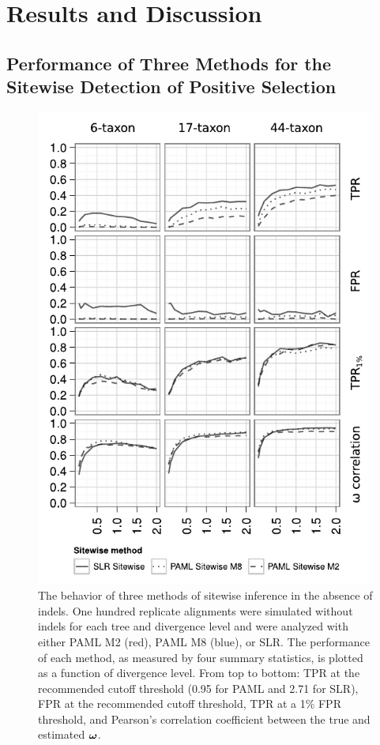 \documentclass{mbe}
\begin{document}
\section*{Results and Discussion}

\subsection*{Performance of Three Methods for the Sitewise Detection of Positive Selection}

\begin{figure}[h]
\begin{center}
\includegraphics[scale=0.75]{fig2.pdf}
\end{center}
\caption{The behavior of three methods of sitewise inference in the
  absence of indels. One hundred replicate alignments were simulated
  without indels for each tree and divergence level and were analyzed
  with either PAML M2 (red), PAML M8 (blue), or SLR. The performance
  of each method, as measured by four summary statistics, is plotted
  as a function of divergence level. From top to bottom: TPR at the
  recommended cutoff threshold (0.95 for PAML and 2.71 for SLR), FPR
  at the recommended cutoff threshold, TPR at a 1\% FPR threshold, and
  Pearson's correlation coefficient between the true and estimated
  $\bm{\omega}{}$.}
\label{fig_2}
\end{figure}
\end{document}
